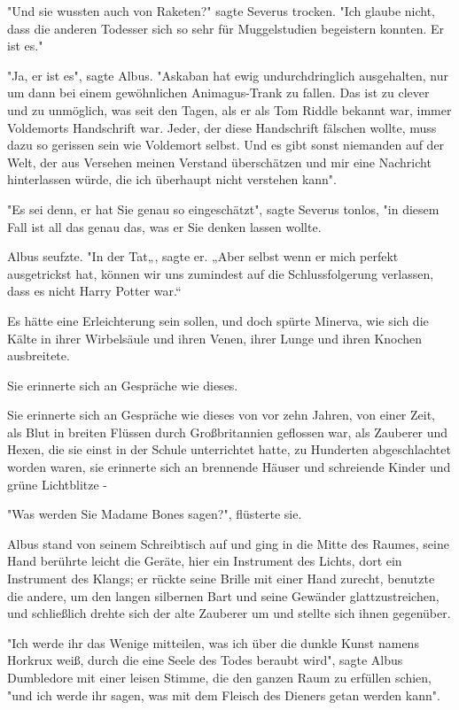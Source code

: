 {"Und sie wussten auch von Raketen?" sagte Severus trocken. "Ich glaube nicht, dass die anderen Todesser sich so sehr für Muggelstudien begeistern konnten. Er ist es."

"Ja, er ist es", sagte Albus. "Askaban hat ewig undurchdringlich ausgehalten, nur um dann bei einem gewöhnlichen Animagus-Trank zu fallen. Das ist zu clever und zu unmöglich, was seit den Tagen, als er als Tom Riddle bekannt war, immer Voldemorts Handschrift war. Jeder, der diese Handschrift fälschen wollte, muss dazu so gerissen sein wie Voldemort selbst. Und es gibt sonst niemanden auf der Welt, der aus Versehen meinen Verstand überschätzen und mir eine Nachricht hinterlassen würde, die ich überhaupt nicht verstehen kann".

"Es sei denn, er hat Sie genau so eingeschätzt", sagte Severus tonlos, "in diesem Fall ist all das genau das, was er Sie denken lassen wollte.

Albus seufzte. "In der Tat„, sagte er. „Aber selbst wenn er mich perfekt ausgetrickst hat, können wir uns zumindest auf die Schlussfolgerung verlassen, dass es nicht Harry Potter war.“

Es hätte eine Erleichterung sein sollen, und doch spürte Minerva, wie sich die Kälte in ihrer Wirbelsäule und ihren Venen, ihrer Lunge und ihren Knochen ausbreitete.

Sie erinnerte sich an Gespräche wie dieses.

Sie erinnerte sich an Gespräche wie dieses von vor zehn Jahren, von einer Zeit, als Blut in breiten Flüssen durch Großbritannien geflossen war, als Zauberer und Hexen, die sie einst in der Schule unterrichtet hatte, zu Hunderten abgeschlachtet worden waren, sie erinnerte sich an brennende Häuser und schreiende Kinder und grüne Lichtblitze -

"Was werden Sie Madame Bones sagen?", flüsterte sie.

Albus stand von seinem Schreibtisch auf und ging in die Mitte des Raumes, seine Hand berührte leicht die Geräte, hier ein Instrument des Lichts, dort ein Instrument des Klangs; er rückte seine Brille mit einer Hand zurecht, benutzte die andere, um den langen silbernen Bart und seine Gewänder glattzustreichen, und schließlich drehte sich der alte Zauberer um und stellte sich ihnen gegenüber.

"Ich werde ihr das Wenige mitteilen, was ich über die dunkle Kunst namens Horkrux weiß, durch die eine Seele des Todes beraubt wird", sagte Albus Dumbledore mit einer leisen Stimme, die den ganzen Raum zu erfüllen schien, "und ich werde ihr sagen, was mit dem Fleisch des Dieners getan werden kann".

}
